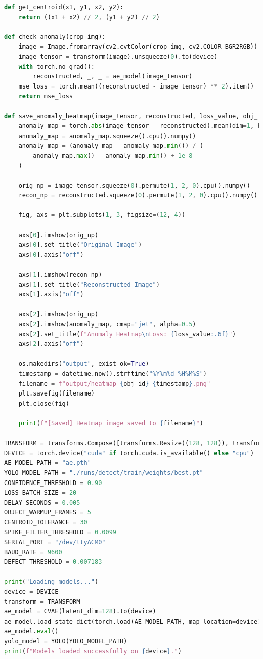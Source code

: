 \begin{lstlisting}[language=Python]
def get_centroid(x1, y1, x2, y2):
    return ((x1 + x2) // 2, (y1 + y2) // 2)

def check_anomaly(crop_img):
    image = Image.fromarray(cv2.cvtColor(crop_img, cv2.COLOR_BGR2RGB))
    image_tensor = transform(image).unsqueeze(0).to(device)
    with torch.no_grad():
        reconstructed, _, _ = ae_model(image_tensor)
    mse_loss = torch.mean((reconstructed - image_tensor) ** 2).item()
    return mse_loss

def save_anomaly_heatmap(image_tensor, reconstructed, loss_value, obj_id):
    anomaly_map = torch.abs(image_tensor - reconstructed).mean(dim=1, keepdim=True)
    anomaly_map = anomaly_map.squeeze().cpu().numpy()
    anomaly_map = (anomaly_map - anomaly_map.min()) / (
        anomaly_map.max() - anomaly_map.min() + 1e-8
    )

    orig_np = image_tensor.squeeze(0).permute(1, 2, 0).cpu().numpy()
    recon_np = reconstructed.squeeze(0).permute(1, 2, 0).cpu().numpy()

    fig, axs = plt.subplots(1, 3, figsize=(12, 4))

    axs[0].imshow(orig_np)
    axs[0].set_title("Original Image")
    axs[0].axis("off")

    axs[1].imshow(recon_np)
    axs[1].set_title("Reconstructed Image")
    axs[1].axis("off")

    axs[2].imshow(orig_np)
    axs[2].imshow(anomaly_map, cmap="jet", alpha=0.5)
    axs[2].set_title(f"Anomaly Heatmap\nLoss: {loss_value:.6f}")
    axs[2].axis("off")

    os.makedirs("output", exist_ok=True)
    timestamp = datetime.now().strftime("%Y%m%d_%H%M%S")
    filename = f"output/heatmap_{obj_id}_{timestamp}.png"
    plt.savefig(filename)
    plt.close(fig)

    print(f"[Saved] Heatmap image saved to {filename}")

TRANSFORM = transforms.Compose([transforms.Resize((128, 128)), transforms.ToTensor()])
DEVICE = torch.device("cuda" if torch.cuda.is_available() else "cpu")
AE_MODEL_PATH = "ae.pth"
YOLO_MODEL_PATH = "./runs/detect/train/weights/best.pt"
CONFIDENCE_THRESHOLD = 0.90
LOSS_BATCH_SIZE = 20
DELAY_SECONDS = 0.005
OBJECT_WARMUP_FRAMES = 5
CENTROID_TOLERANCE = 30
SPIKE_FILTER_THRESHOLD = 0.0099
SERIAL_PORT = "/dev/ttyACM0"
BAUD_RATE = 9600
DEFECT_THRESHOLD = 0.007183

print("Loading models...")
device = DEVICE
transform = TRANSFORM
ae_model = CVAE(latent_dim=128).to(device)
ae_model.load_state_dict(torch.load(AE_MODEL_PATH, map_location=device))
ae_model.eval()
yolo_model = YOLO(YOLO_MODEL_PATH)
print(f"Models loaded successfully on {device}.")


\end{lstlisting}

